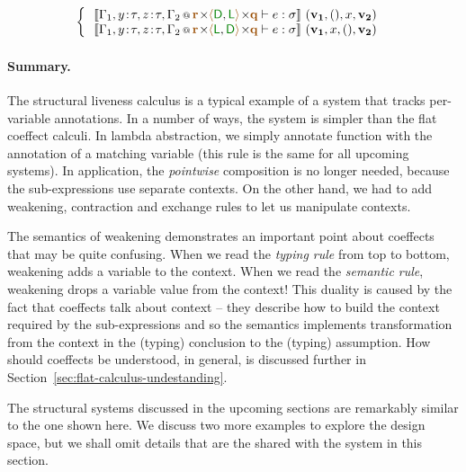 \begin{figure}[t]
\begin{equation*}
\begin{array}{l}
\begin{cases}
~~\sem{\coctx{\Gamma_1,y\!:\!\tau,z\!:\!\tau,\Gamma_2}{\aclrd{\textbf{r}} \cons \alift{\cclrd{\ident{D}},\cclrd{\ident{L}}} \cons \aclrd{\textbf{q}}} \vdash e : \sigma}~(\mathbf{v_1}, (), x, \mathbf{v_2})\\[-0.25em]
~~\sem{\coctx{\Gamma_1,y\!:\!\tau,z\!:\!\tau,\Gamma_2}{\aclrd{\textbf{r}} \cons \alift{\cclrd{\ident{L}},\cclrd{\ident{D}}} \cons \aclrd{\textbf{q}}} \vdash e : \sigma}~(\mathbf{v_1}, x, (), \mathbf{v_2})
\end{cases}
\end{array}
\end{equation*}
\vspace{-0.5em}
\label{fig:applications-struct-livesem}
\end{figure}
\vspace{-0.5em}


\paragraph{Summary.}
The structural liveness calculus is a typical example of a system that tracks per-variable 
annotations. In a number of ways, the system is simpler than the flat coeffect calculi. In
lambda abstraction, we simply annotate function with the annotation of a matching variable 
(this rule is the same for all upcoming systems). In application, the \emph{pointwise} composition
is no longer needed, because the sub-expressions use separate contexts. On the other hand, 
we had to add weakening, contraction and exchange rules to let us manipulate contexts.

The semantics of weakening demonstrates an important point about coeffects that may be quite
confusing. When we read the \emph{typing rule} from top to bottom, weakening adds a variable
to the context. When we read the \emph{semantic rule}, weakening drops a variable value from the 
context! This duality is caused by the fact that coeffects talk about context -- they describe
how to build the context required by the sub-expressions and so the semantics implements 
transformation from the context in the (typing) conclusion to the (typing) assumption. How
should coeffects be understood, in general, is discussed further in Section~\ref{sec:flat-calculus-undestanding}.

The structural systems discussed in the upcoming sections are remarkably similar to the one
shown here. We discuss two more examples to explore the design space, but we shall
omit details that are the shared with the system in this section.

